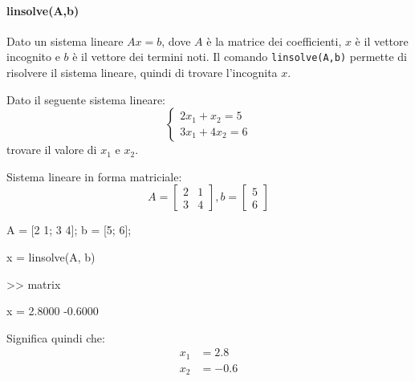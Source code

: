 \paragraph{linsolve(A,b)} Dato un sistema lineare $ Ax=b $, dove $ A $ è la matrice dei coefficienti, $ x $
è il vettore incognito e $ b $ è il vettore dei termini noti.
Il comando \verb|linsolve(A,b)| permette di risolvere il sistema lineare, quindi di trovare l'incognita $ x $.
\begin{example}
    Dato il seguente sistema lineare:
    \[
        \begin{cases}
            2x_1 + x_2 = 5 \\
            3x_1 + 4x_2 = 6
        \end{cases}
    \]
    trovare il valore di $ x_{1} $ e $ x_{2} $.
\end{example}
Sistema lineare in forma matriciale:
\[ A=
    \begin{bmatrix}
        2 & 1 \\
        3 & 4
    \end{bmatrix},
    b=
    \begin{bmatrix}
        5 \\ 6
    \end{bmatrix}
\]
\begin{matlab}
    A = [2 1; 3 4];   %
    b = [5; 6];       %

    x = linsolve(A, b)
\end{matlab}
\begin{matlabconsole}
    >> matrix

    x =
    2.8000
    -0.6000
\end{matlabconsole}
Significa quindi che:
\begin{align*}
    x_{1} & =2.8  \\
    x_{2} & =-0.6
\end{align*}
